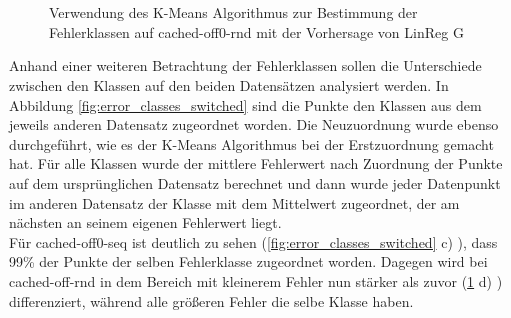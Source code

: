 \documentclass[
	12pt,
	a4paper,
	BCOR10mm,
	DIV14,
	listof=totoc,
	bibliography=totoc,
	headsepline
]{scrreprt}
\begin{document}
\begin{figure}
{	}\\
	\\
	\caption{Verwendung des K-Means Algorithmus zur Bestimmung der Fehlerklassen auf cached-off0-rnd mit der Vorhersage von \glqq LinReg G\grqq}
	\label{fig:error_class_clustering_rnd}
\end{figure} 

Anhand einer weiteren Betrachtung der Fehlerklassen sollen die Unterschiede zwischen den Klassen auf den beiden Datensätzen analysiert werden.
In Abbildung \ref{fig:error_classes_switched} sind die Punkte den Klassen aus dem jeweils anderen Datensatz zugeordnet worden. Die Neuzuordnung wurde ebenso durchgeführt, wie es der K-Means Algorithmus bei der Erstzuordnung gemacht hat. Für alle Klassen wurde der mittlere Fehlerwert nach Zuordnung der Punkte auf dem ursprünglichen Datensatz berechnet und dann wurde jeder Datenpunkt im anderen Datensatz der Klasse mit dem Mittelwert zugeordnet, der am nächsten an seinem eigenen Fehlerwert liegt.\\ 
Für cached-off0-seq ist deutlich zu sehen (\ref{fig:error_classes_switched} c) ), dass 99\% der Punkte der selben Fehlerklasse zugeordnet worden. Dagegen wird bei cached-off-rnd in dem Bereich mit kleinerem Fehler nun stärker als zuvor (\ref{fig:error_class_clustering_rnd} d) ) differenziert, während alle größeren Fehler die selbe Klasse haben.
\end{document}
